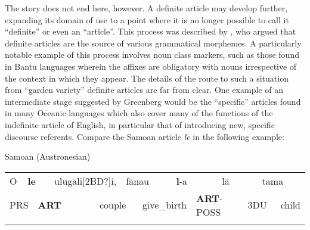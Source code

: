 \begin{styleBodytextC}
The story does not end here, however. A definite article may develop further, expanding its domain of use to a point where it is no longer possible to call it “definite” or even an “article”. This process was described by \citet{Greenberg1978}, who argued that definite articles are the source of various grammatical morphemes.  A particularly notable example of this process involves noun class markers, such  as those found in Bantu languages wherein the affixes are obligatory with nouns irrespective of the context in which they appear. The details of the route to such a situation from “garden variety” definite articles are far from clear. One example of an intermediate stage suggested by Greenberg would be the “specific” articles found in many Oceanic languages which also cover many of the functions of the indefinite article of English, in particular that of introducing new, specific discourse referents. Compare the Samoan article \textit{le} in the following example: 

\end{styleBodytextC}


\begin{listWWNumileveli}
\item 

\begin{styleExample}
Samoan (Austronesian)

\end{styleExample}

\end{listWWNumileveli}

\begin{tabular}{llllllllllllll}
\lsptoprule
[2BD?]O & \multicolumn{2}{l}{{\bfseries le}

} & \multicolumn{2}{l}{ulug\=ali[2BD?]i,

} & \multicolumn{2}{l}{f\=anau

} & \multicolumn{2}{l}{\textbf{l}{}-a

} & \multicolumn{2}{l}{l\=a

} & \multicolumn{2}{l}{tama

} & \\
\multicolumn{2}{l}{PRS

} & \multicolumn{2}{l}{{\bfseries ART}

} & \multicolumn{2}{l}{couple

} & \multicolumn{2}{l}{give\_birth

} & \multicolumn{2}{l}{\textbf{ART}{}-POSS

} & \multicolumn{2}{l}{3DU

} & \multicolumn{2}{l}{child

}\\
\lspbottomrule
\end{tabular}

